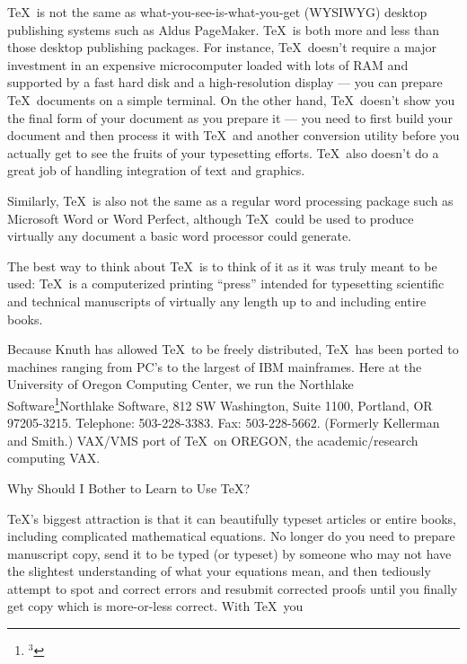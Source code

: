 \bigskip\par\noindent 
\TeX\ is {\twlit not} the same as what-you-see-is-what-you-get 
(WYSIWYG) desktop publishing systems such as Aldus PageMaker.
\TeX\ is both more and less than those desktop publishing 
packages. For instance, \TeX\ doesn't require a major investment in an 
expensive microcomputer loaded with lots of RAM and supported by a fast 
hard disk and a high-resolution display --- you can prepare \TeX\ documents 
on a simple terminal. On the other hand, \TeX\ doesn't show you 
the final form of your
document as you prepare it --- you need to first build your document and 
then process it with \TeX\ and another conversion utility before you 
actually get to see the fruits of your typesetting efforts. \TeX\ also
doesn't do a great job of handling integration of text
and graphics.
\bigskip\par\noindent
Similarly, \TeX\ is also {\twlit not} the same as a regular word 
processing package such as Microsoft Word or Word Perfect, 
although \TeX\ could be used to produce virtually any document a 
basic word processor could generate. 
\bigskip\par\noindent
The best way to think about \TeX\ is to think of it as it was truly
meant to be used: \TeX\ is a computerized printing ``press'' 
intended for typesetting scientific and technical manuscripts
of virtually any length up to and including entire books.
\bigskip\par\noindent
Because Knuth has allowed \TeX\ to be freely distributed, \TeX\ has been 
ported to machines ranging from PC's to the largest of IBM mainframes. 
Here at the University of Oregon Computing Center, we run the Northlake 
Software\footnote{$^{3}$}{Northlake Software, 812 SW Washington, Suite 
1100, Portland, OR 97205-3215. Telephone: 503-228-3383. Fax: 
503-228-5662. (Formerly Kellerman and Smith.)} 
VAX/VMS port of \TeX\ on OREGON, the academic/research computing VAX.
\bigskip\bigskip\par\noindent
\centerline{\twlbf Why Should I Bother to Learn to Use \TeX?}
\bigskip\par\noindent
\TeX{}'s biggest attraction is that it can beautifully typeset articles or 
entire books, including complicated mathematical equations. 
No longer do you need to prepare manuscript copy, send it to be 
typed (or typeset) by someone who may not have the slightest 
understanding of what your equations mean, and then tediously 
attempt to spot and correct errors and resubmit corrected proofs 
until you finally get copy which is more-or-less correct. With \TeX\ you 
